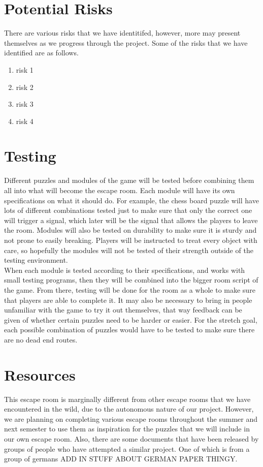 \documentclass[conference]{IEEEtran}
\begin{document}
\section{Potential Risks}
There are various risks that we have identitifed, however, more may present
themselves as we progress through the project. Some of the risks that we have
identified are as follows.
\begin{enumerate}
    \item risk 1
    \item risk 2
    \item risk 3
    \item risk 4
\end{enumerate}


\section{Testing}
Different puzzles and modules of the game will be tested before combining
them all into what will become the escape room. Each module will have its
own specifications on what it should do. For example, the chess board puzzle
will have lots of different combinations tested just to make sure that only
the correct one will trigger a signal, which later will be the signal that
allows the players to leave the room. Modules will also be tested on
durability to make sure it is sturdy and not prone to easily breaking.
Players will be instructed to treat every object with care, so hopefully
the modules will not be tested of their strength outside of the testing
environment.
\\
\indent When each module is tested according to their specifications, and works
with small testing programs, then they will be combined into the bigger
room script of the game. From there, testing will be done for the room
as a whole to make sure that players are able to complete it. It may also
be necessary to bring in people unfamiliar with the game to try it out
themselves, that way feedback can be given of whether certain puzzles
need to be harder or easier. For the stretch goal, each possible combination
of puzzles would have to be tested to make sure there are no dead end routes.

\section{Resources}
This escape room is marginally different from other escape rooms that we have
encountered in the wild, due to the autonomous nature of our project. However,
we are planning on completing various escape rooms throughout the summer and
next semester to use them as inspiration for the puzzles that we will include
in our own escape room. Also, there are some documents that have been released
by groups of people who have attempted a similar project. One of which is from
a group of germans ADD IN STUFF ABOUT GERMAN PAPER THINGY.
\end{document}
